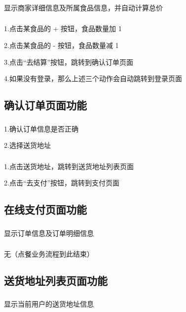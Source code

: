 \subsubsection*{}
显示商家详细信息及所属食品信息，并自动计算总价
\subsubsection*{}
1.点击某食品的 + 按钮，食品数量加 1

2.点击某食品的 - 按钮，食品数量减 1

3.点击“去结算”按钮，跳转到确认订单页面

4.如果没有登录，那么上述三个动作会自动跳转到登录页面

\subsection{确认订单页面功能}
\subsubsection*{}
1.确认订单信息是否正确

2.选择送货地址
\subsubsection*{}
1.点击送货地址，跳转到送货地址列表页面

2.点击“去支付”按钮，跳转到支付页面

\subsection{在线支付页面功能}
\subsubsection*{}
显示订单信息及订单明细信息
\subsubsection*{}
无（点餐业务流程到此结束）

\subsection{送货地址列表页面功能}
\subsubsection*{}
显示当前用户的送货地址信息
